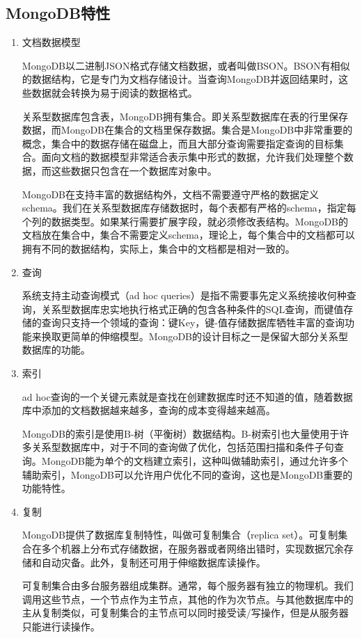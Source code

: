 \documentclass[11pt, a4paper, oneside]{ctexart}
\begin{document}
\subsection{MongoDB特性}
\begin{enumerate}
    \item 文档数据模型
    
    MongoDB以二进制JSON格式存储文档数据，或者叫做BSON。BSON有相似的数据结构，它是专门为文档存储设计。当查询MongoDB并返回结果时，这些数据就会转换为易于阅读的数据格式。
    
    关系型数据库包含表，MongoDB拥有集合。即关系型数据库在表的行里保存数据，而MongoDB在集合的文档里保存数据。集合是MongoDB中非常重要的概念，集合中的数据存储在磁盘上，而且大部分查询需要指定查询的目标集合。面向文档的数据模型非常适合表示集中形式的数据，允许我们处理整个数据，而这些数据只包含在一个数据库对象中。
    
    MongoDB在支持丰富的数据结构外，文档不需要遵守严格的数据定义schema。我们在关系型数据库存储数据时，每个表都有严格的schema，指定每个列的数据类型。如果某行需要扩展字段，就必须修改表结构。MongoDB的文档放在集合中，集合不需要定义schema，理论上，每个集合中的文档都可以拥有不同的数据结构，实际上，集合中的文档都是相对一致的。
    \item 查询

    系统支持主动查询模式（ad hoc queries）是指不需要事先定义系统接收何种查询，关系型数据库忠实地执行格式正确的包含各种条件的SQL查询，而键值存储的查询只支持一个领域的查询：键Key，键-值存储数据库牺牲丰富的查询功能来换取更简单的伸缩模型。MongoDB的设计目标之一是保留大部分关系型数据库的功能。
    \item 索引

    ad hoc查询的一个关键元素就是查找在创建数据库时还不知道的值，随着数据库中添加的文档数据越来越多，查询的成本变得越来越高。
    
    MongoDB的索引是使用B-树（平衡树）数据结构。B-树索引也大量使用于许多关系型数据库中，对于不同的查询做了优化，包括范围扫描和条件子句查询。MongoDB能为单个的文档建立索引，这种叫做辅助索引，通过允许多个辅助索引，MongoDB可以允许用户优化不同的查询，这也是MongoDB重要的功能特性。
    \item 复制

    MongoDB提供了数据库复制特性，叫做可复制集合（replica set）。可复制集合在多个机器上分布式存储数据，在服务器或者网络出错时，实现数据冗余存储和自动灾备。此外，复制还可用于伸缩数据库读操作。
    
    可复制集合由多台服务器组成集群。通常，每个服务器有独立的物理机。我们调用这些节点，一个节点作为主节点，其他的作为次节点。与其他数据库中的主从复制类似，可复制集合的主节点可以同时接受读/写操作，但是从服务器只能进行读操作。
    

\end{enumerate}
\end{document}
